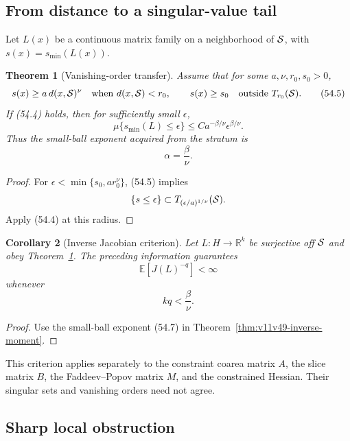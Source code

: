 \documentclass[11pt]{article}
\newtheorem{theorem}{Theorem}[section]
\newtheorem{corollary}[theorem]{Corollary}
\begin{document}
\subsection{From distance to a singular-value tail}

Let \(L(x)\) be a continuous matrix family on a neighborhood of
\({\cal S}\), with \(s(x)=s_{\min}(L(x))\).

\begin{theorem}[Vanishing-order transfer]
\label{thm:v11v54-order}
Assume that for some \(a,\nu,r_0,s_0>0\),
\[
 s(x)\ge a\,d(x,{\cal S})^\nu
       \quad\text{when }d(x,{\cal S})<r_0,\qquad
 s(x)\ge s_0
       \quad\text{outside }T_{r_0}({\cal S}).                 \tag{54.5}
\]
If (54.4) holds, then for sufficiently small \(\epsilon\),
\[
             \mu\{s_{\min}(L)\le\epsilon\}
                  \le C a^{-\beta/\nu}
                         \epsilon^{\beta/\nu}.                \tag{54.6}
\]
Thus the small-ball exponent acquired from the stratum is
\[
                              \alpha=\frac{\beta}{\nu}.        \tag{54.7}
\]
\end{theorem}

\begin{proof}
For
\(\epsilon<\min\{s_0,ar_0^\nu\}\), (54.5) implies
\[
 \{s\le\epsilon\}\subset
 T_{(\epsilon/a)^{1/\nu}}({\cal S}).
\]
Apply (54.4) at this radius.
\end{proof}

\begin{corollary}[Inverse Jacobian criterion]
\label{cor:v11v54-inverse}
Let \(L:H\to\mathbb R^k\) be surjective off \({\cal S}\) and obey
Theorem~\ref{thm:v11v54-order}.  The preceding information guarantees
\[
                         \mathbb E[J(L)^{-q}]<\infty          \tag{54.8}
\]
whenever
\[
                              kq<\frac{\beta}{\nu}.            \tag{54.9}
\]
\end{corollary}

\begin{proof}
Use the small-ball exponent (54.7) in
Theorem~\ref{thm:v11v49-inverse-moment}.
\end{proof}

This criterion applies separately to the constraint coarea matrix
\(A\), the slice matrix \(B\), the Faddeev--Popov matrix \(M\), and the
constrained Hessian.  Their singular sets and vanishing orders need
not agree.

\subsection{Sharp local obstruction}
\end{document}
